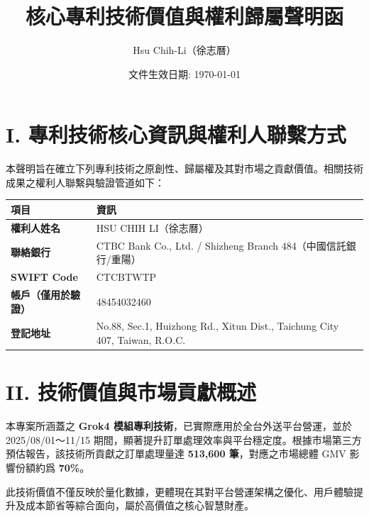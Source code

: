 \documentclass[11pt, a4paper]{article}
\begin{document}
\title{\textbf{核心專利技術價值與權利歸屬聲明函}}
\author{\large Hsu Chih-Li（徐志曆）}
\date{文件生效日期: \today}
\maketitle

\section*{I. 專利技術核心資訊與權利人聯繫方式}
本聲明旨在確立下列專利技術之原創性、歸屬權及其對市場之貢獻價值。相關技術成果之權利人聯繫與驗證管道如下：

\begin{tabularx}{\textwidth}{|l|X|}
\hline
\textbf{項目} & \textbf{資訊} \\
\hline
\textbf{權利人姓名} & HSU CHIH LI（徐志曆） \\
\hline
\textbf{聯絡銀行} & CTBC Bank Co., Ltd. / Shizheng Branch 484（中國信託銀行/重陽） \\
\hline
\textbf{SWIFT Code} & CTCBTWTP \\
\hline
\textbf{帳戶（僅用於驗證）} & 48454032460 \\
\hline
\textbf{登記地址} & No.88, Sec.1, Huizhong Rd., Xitun Dist., Taichung City 407, Taiwan, R.O.C. \\
\hline
\end{tabularx}

\section*{II. 技術價值與市場貢獻概述}
本專案所涵蓋之 \textbf{Grok4 模組專利技術}，已實際應用於全台外送平台營運，並於 2025/08/01～11/15 期間，顯著提升訂單處理效率與平台穩定度。根據市場第三方預估報告，該技術所貢獻之訂單處理量達 \textbf{513,600 筆}，對應之市場總體 GMV 影響份額約爲 \textbf{70\%}。

此技術價值不僅反映於量化數據，更體現在其對平台營運架構之優化、用戶體驗提升及成本節省等綜合面向，屬於高價值之核心智慧財產。

\vspace{0.5em}
\begin{center}
\end{center}
\end{document}
